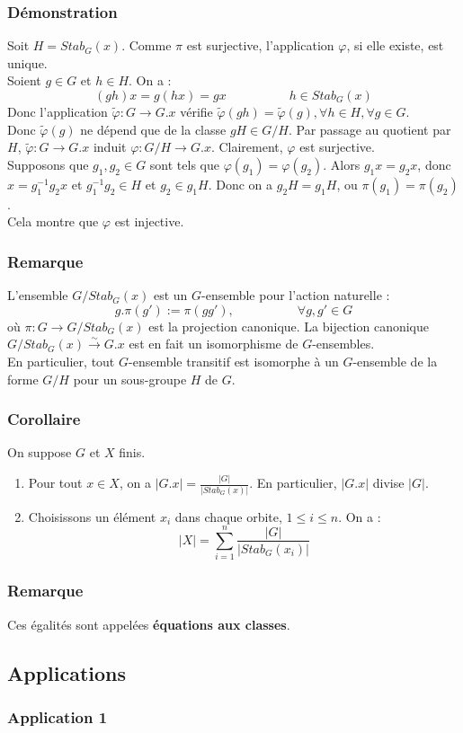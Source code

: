 \documentclass[a4paper, oneside]{report}
\newcommand{\dem}{\subsubsection{Démonstration}}
\newcommand{\remar}{\subsubsection{Remarque}}
\newcommand{\cor}{\subsubsection{Corollaire}}
\newcommand{\fong}{\overset{\sim}{\rightarrow}}
\begin{document}
\dem
Soit $H=Stab_G(x)$. Comme $\pi$ est surjective, l'application $\varphi$, si elle existe, est unique.\\
Soient $g\in G$ et $h\in H$. On a :
$$(gh)x = g(hx)=gx\hspace{5em}h\in Stab_G(x)$$
Donc l'application $\tilde{\varphi}: G\rightarrow G.x$ vérifie $\tilde{\varphi}(gh)=\tilde{\varphi}(g), \forall h\in H, \forall g\in G$.\\
Donc $\tilde{\varphi}(g)$ ne dépend que de la classe $gH\in G/H$. Par passage au quotient par $H$, $\tilde{\varphi}:G \rightarrow G.x$ induit $\varphi :G/H \rightarrow G.x$. Clairement, $\varphi$ est surjective.\\
Supposons que $g_1, g_2\in G$ sont tels que $\varphi(g_1)=\varphi(g_2)$. Alors $g_1x=g_2x$, donc $x=g_1^{-1}g_2x$ et $g_1^{-1}g_2\in H$ et $g_2\in g_1H$. Donc on a $g_2H=g_1H$, ou $\pi(g_1)=\pi(g_2)$.\\
Cela montre que $\varphi$ est injective.

\remar
L'ensemble $G/Stab_G(x)$ est un $G$-ensemble pour l'action naturelle :
$$ g.\pi(g') := \pi(gg'),\hspace{5em}\forall g,g'\in G$$
où $\pi : G\rightarrow G/Stab_G(x)$ est la projection canonique. La bijection canonique $G/Stab_G(x)\fong G.x$ est en fait un isomorphisme de $G$-ensembles.\\
En particulier, tout $G$-ensemble transitif est isomorphe à un $G$-ensemble de la forme $G/H$ pour un sous-groupe $H$ de $G$.

\cor
On suppose $G$ et $X$ finis.
\begin{enumerate}
\item Pour tout $x\in X$, on a $|G.x|=\frac{|G|}{|Stab_G(x)|}$. En particulier, $|G.x|$ divise $|G|$.
\item Choisissons un élément $x_i$ dans chaque orbite, $1\leq i \leq n$. On a :
$$|X|=\sum_{i=1}^{n}\frac{|G|}{|Stab_G(x_i)|}$$
\end{enumerate}

\remar
Ces égalités sont appelées \textbf{équations aux classes}.

\subsection{Applications}

\subsubsection{Application 1}
\end{document}
